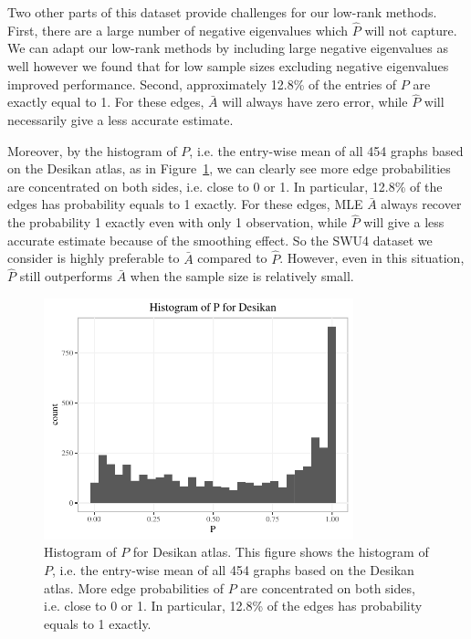 Two other parts of this dataset provide challenges for our low-rank methods.
First, there are a large number of negative eigenvalues which $\hat{P}$ will not capture.
We can adapt our low-rank methods by including large negative eigenvalues as well however we found that for low sample sizes excluding negative eigenvalues improved performance.
Second, approximately 12.8\% of the entries of $P$ are exactly equal to 1.
For these edges, $\bar{A}$ will always have zero error, while $\hat{P}$ will necessarily give a less accurate estimate. 

Moreover, by the histogram of $P$, i.e. the entry-wise mean of all 454 graphs based on the Desikan atlas, as in Figure~\ref{fig:P_hist_desikan}, we can clearly see more edge probabilities are concentrated on both sides, i.e. close to 0 or 1. In particular, 12.8\% of the edges has probability equals to 1 exactly. For these edges, MLE $\bar{A}$ always recover the probability 1 exactly even with only 1 observation, while $\hat{P}$ will give a less accurate estimate because of the smoothing effect. So the SWU4 dataset we consider is highly preferable to $\bar{A}$ compared to $\hat{P}$. 
However, even in this situation, $\hat{P}$ still outperforms $\bar{A}$ when the sample size is relatively small.

 \begin{figure}
 \centering
 \includegraphics[width=0.8\textwidth]{./Figures/P_hist_desikan.pdf}
 \caption[Histogram of mean graph for Desikan atlas]{Histogram of $P$ for Desikan atlas.
 This figure shows the histogram of $P$, i.e. the entry-wise mean of all 454 graphs based on the Desikan atlas. More edge probabilities of $P$ are concentrated on both sides, i.e. close to 0 or 1. In particular, 12.8\% of the edges has probability equals to 1 exactly.}
 \label{fig:P_hist_desikan}
 \end{figure}

